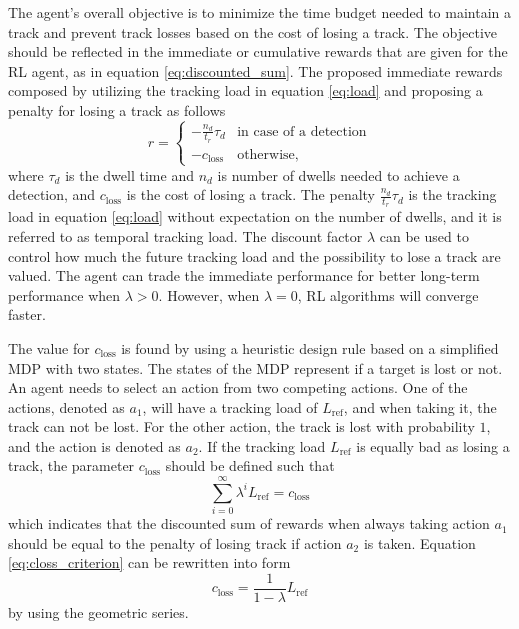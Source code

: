 \documentclass[english, 12pt, a4paper, elec, utf8, a-1b, online]{aaltothesis}
\newcommand{\lref}{L_\text{ref}}
\newcommand{\closs}{c_\text{loss}}
\newcommand{\ri}{t_r}
\begin{document}
The agent's overall objective is to minimize the time budget needed to maintain a track and prevent track losses based on the cost of losing a track.
The objective should be reflected in the immediate or cumulative rewards that are given for the RL agent, as in equation \eqref{eq:discounted_sum}. 
The proposed immediate rewards composed by utilizing the tracking load in equation \eqref{eq:load} and proposing a penalty for losing a track as follows
\begin{equation}
    r = \left\{
    \begin{array}{ll}
        -\frac{n_d}{\ri} \tau_d & \text{in case of a detection}\\
        -\closs & \text{otherwise},
    \end{array} \right.
\end{equation}
where $\tau_d$ is the dwell time and $n_d$ is number of dwells needed to achieve a detection, and $\closs$ is the cost of losing a track.
The penalty $\frac{n_d}{\ri}\tau_d$ is the tracking load in equation \eqref{eq:load} without expectation on the number of dwells, and it is referred to as temporal tracking load.
The discount factor $\lambda$ can be used to control how much the future tracking load and the possibility to lose a track are valued.
The agent can trade the immediate performance for better long-term performance when $\lambda > 0$.
However, when $\lambda = 0$, RL algorithms will converge faster.

The value for $\closs$ is found by using a heuristic design rule based on a simplified MDP with two states.
The states of the MDP represent if a target is lost or not.
An agent needs to select an action from two competing actions.
One of the actions, denoted as $a_1$, will have a tracking load of $\lref$, and when taking it, the track can not be lost.
For the other action, the track is lost with probability $1$, and the action is denoted as $a_2$.
If the tracking load $\lref$ is equally bad as losing a track, the parameter $\closs$ should be defined such that
\begin{equation}\label{eq:closs_criterion}
    \sum_{i=0}^\infty \lambda^i \lref = \closs
\end{equation}
which indicates that the discounted sum of rewards when always taking action $a_1$ should be equal to the penalty of losing track if action $a_2$ is taken.
Equation \eqref{eq:closs_criterion} can be rewritten into form
\begin{equation}
    \closs = \frac{1}{1-\lambda} \lref
\end{equation}
 by using the geometric series.
\end{document}
